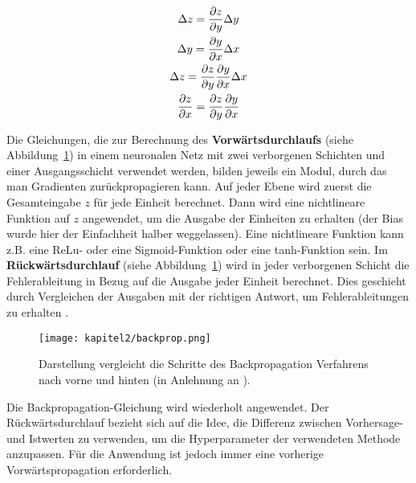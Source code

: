         \begin{gather} \label{ChainRule}
            \Delta z =  \frac{\partial z}{\partial y} \Delta y \notag\\
            \Delta y = \frac{\partial y}{\partial x} \Delta x \notag\\
            \Delta z = \frac{\partial z}{\partial y}\frac{\partial y}{\partial x} \Delta x \notag\\
            \frac{\partial z}{\partial x} = \frac{\partial z}{\partial y} \frac{\partial y}{\partial x}
        \end{gather}




        Die Gleichungen, die zur Berechnung des \textbf{Vorwärtsdurchlaufs} (siehe Abbildung~\ref{BackProp}) in einem neuronalen Netz mit zwei verborgenen Schichten und einer Ausgangsschicht verwendet werden, bilden jeweils ein Modul, durch das man Gradienten zurückpropagieren kann. Auf jeder Ebene wird zuerst die Gesamteingabe $z$ für jede Einheit berechnet. Dann wird eine nichtlineare Funktion auf $z$ angewendet, um die Ausgabe der Einheiten zu erhalten (der Bias wurde hier der Einfachheit halber weggelassen). Eine nichtlineare Funktion kann z.B. eine ReLu- oder eine Sigmoid-Funktion oder eine tanh-Funktion sein. Im \textbf{Rückwärtsdurchlauf} (siehe Abbildung~\ref{BackProp}) wird in jeder verborgenen Schicht die Fehlerableitung in Bezug auf die Ausgabe jeder Einheit berechnet. Dies geschieht durch Vergleichen der Ausgaben mit der richtigen Antwort, um Fehlerableitungen zu erhalten \cite*{Lecun2015}.


        \begin{figure}[H]
            \centering
            \texttt{[image: kapitel2/backprop.png]}
            \caption[Die Vorwärts- und Rückwärtsschritte im Backpropagation]{Darstellung vergleicht die Schritte des Backpropagation Verfahrens nach vorne und hinten (in Anlehnung an \cite*{Lecun2015}).}
            \label{BackProp}
        \end{figure}

        Die Backpropagation-Gleichung wird wiederholt angewendet. Der Rückwärtsdurchlauf bezieht sich auf die Idee, die Differenz zwischen Vorhersage- und Istwerten zu verwenden, um die Hyperparameter der verwendeten Methode anzupassen. Für die Anwendung ist jedoch immer eine vorherige Vorwärtspropagation erforderlich.


